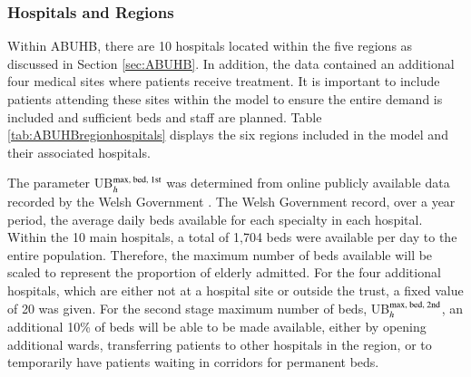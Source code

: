 \documentclass[../thesis.tex]{subfiles}
\begin{document}
\subsubsection{Hospitals and Regions}\label{subsec:hospandregions}
Within ABUHB, there are 10 hospitals located within the five regions as discussed in Section \ref{sec:ABUHB}. In addition, the data contained an additional four medical sites where patients receive treatment. It is important to include patients attending these sites within the model to ensure the entire demand is included and sufficient beds and staff are planned. Table \ref{tab:ABUHBregionhospitals} displays the six regions included in the model and their associated hospitals.
\begin{table}[h!]
    \centering{}
    \caption{List of the 14 care locations within ABUHB and their associated regions.}
    \label{tab:ABUHBregionhospitals}
\end{table}

The parameter UB$_{h}^{\textnormal{max, bed, 1st}}$ was determined from online publicly available data recorded by the Welsh Government \cite{StatsWales2021}. The Welsh Government record, over a year period, the average daily beds available for each specialty in each hospital. Within the 10 main hospitals, a total of 1,704 beds were available per day to the entire population. Therefore, the maximum number of beds available will be scaled to represent the proportion of elderly admitted. For the four additional hospitals, which are either not at a hospital site or outside the trust, a fixed value of 20 was given. For the second stage maximum number of beds,  UB$_{h}^{\textnormal{max, bed, 2nd}}$, an additional 10\% of beds will be able to be made available, either by opening additional wards, transferring patients to other hospitals in the region, or to temporarily have patients waiting in corridors for permanent beds.
\end{document}
